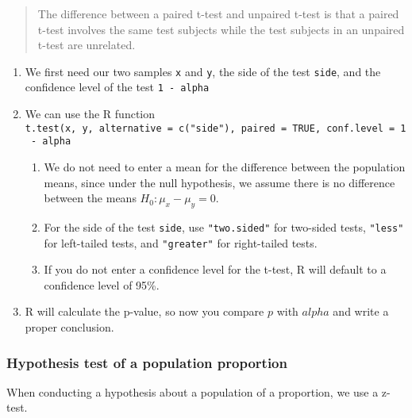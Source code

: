 \begin{quote}
The difference between a paired t-test and unpaired t-test is that a
paired t-test involves the same test subjects while the test subjects in
an unpaired t-test are unrelated.
\end{quote}

\begin{enumerate}
\def\labelenumi{\arabic{enumi}.}
\item
  We first need our two samples \texttt{x} and \texttt{y}, the side of
  the test \texttt{side}, and the confidence level of the test
  \texttt{1\ -\ alpha}
\item
  We can use the R function
  \texttt{t.test(x,\ y,\ alternative\ =\ c("side"),\ paired\ =\ TRUE,\ conf.level\ =\ 1\ -\ alpha}

  \begin{enumerate}
  \def\labelenumii{\alph{enumii}.}
  \item
    We do not need to enter a mean for the difference between the
    population means, since under the null hypothesis, we assume there
    is no difference between the means \(H_0: \mu_x - \mu_y = 0\).
  \item
    For the side of the test \texttt{side}, use \texttt{"two.sided"} for
    two-sided tests, \texttt{"less"} for left-tailed tests, and
    \texttt{"greater"} for right-tailed tests.
  \item
    If you do not enter a confidence level for the t-test, R will
    default to a confidence level of 95\%.
  \end{enumerate}
\item
  R will calculate the p-value, so now you compare \(p\) with \(alpha\)
  and write a proper conclusion.
\end{enumerate}

\hypertarget{hypothesis-test-of-a-population-proportion}{%
\subsubsection{Hypothesis test of a population
proportion}\label{hypothesis-test-of-a-population-proportion}}

When conducting a hypothesis about a population of a proportion, we use
a z-test.

